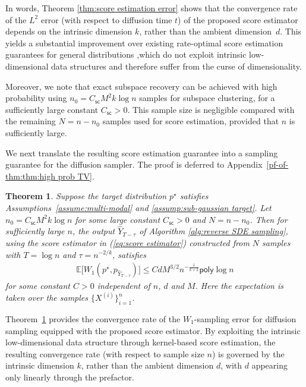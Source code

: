 \documentclass{article}
\newcommand{\polylog}{\mathsf{poly}\log}
\theoremstyle{plain}
\newtheorem{theorem}{\bf Theorem}
\theoremstyle{remark}
\begin{document}
In words, Theorem \ref{thm:score estimation error} shows that the convergence rate of the $L^2$ error (with respect to diffusion time $t$) of the proposed score estimator depends on the intrinsic dimension $k$, rather than the ambient dimension~$d$. 
This yields a substantial improvement over existing rate-optimal score estimation guarantees for general distributions  \citep{wibisono2024optimal,zhang2024minimaxoptimalityscorebaseddiffusion,dou2024optimalscorematchingoptimal,cai2025minimaxoptimalityprobabilityflow},which do not exploit intrinsic low-dimensional data structures and therefore suffer from the curse of dimensionality. 


Moreover, we note that exact subspace recovery can be achieved with high probability using $n_0=C_{\mathsf{sc}}M^2k\log n$ samples for subspace clustering, for a sufficiently large constant $C_{\mathsf{sc}}>0$. This sample size is negligible compared with the remaining $N=n-n_0$ samples used for score estimation, provided that $n$ is sufficiently large.

We next translate the resulting score estimation guarantee into a sampling guarantee for the diffusion sampler. 
The proof is deferred to Appendix~\ref{pf-of-thm:thm:high prob TV}.


\begin{theorem}
    \label{thm:high prob TV}
    Suppose the target distribution $p^\star$ satisfies Assumptions~\ref{assume:multi-modal} and \ref{assump:sub-gaussian target}.
    Let $n_0 = C_{\mathsf{sc}}M^2 k \log n$ for some large constant $C_{\mathsf{sc}} > 0$ and $N=n-n_0$. Then for sufficiently large $n$, the output $\widehat{Y}_{T-\tau}$ of Algorithm \ref{alg:reverse SDE sampling}, using the score estimator in (\ref{eq:score estimator}) constructed from $N$ samples with  $T=\log n$ and $\tau = n^{-2/k}$, satisfies
    \begin{align}\label{eq:W_1 bound}
        \mathbb{E}\big[W_1(p^\star,p_{\widehat{Y}_{T-\tau}})\big] \leq C d M^{3/2} n^{-\frac1{k\vee 2}} \polylog n
    \end{align}
    for some constant $C>0$ independent of $n$, $d$ and $M$.
    Here the expectation is taken over the samples $\{X^{(i)}\}_{i=1}^n$.
\end{theorem}


Theorem~\ref{thm:high prob TV} provides the convergence rate of the $W_1$-sampling error for diffusion sampling equipped with the proposed score estimator. 
By exploiting the intrinsic low-dimensional data structure through kernel-based score estimation, the resulting convergence rate (with respect to sample size $n$) is governed by the intrinsic dimension $k$, rather than the ambient dimension $d$, with $d$ appearing only linearly through the prefactor.
\end{document}
